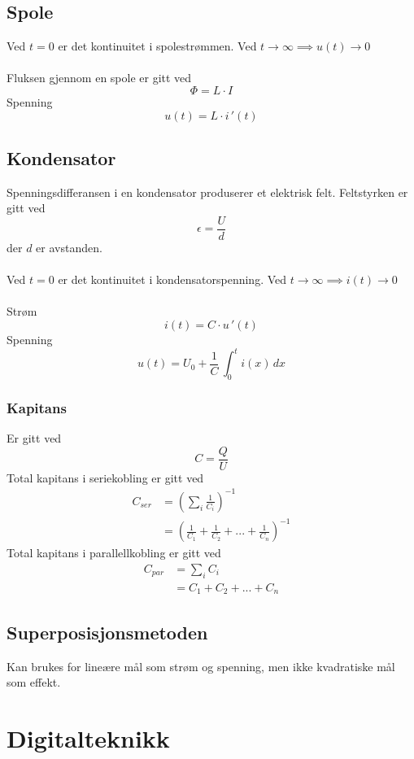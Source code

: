\documentclass{article}
\begin{document}
\subsection{Spole}
Ved $t = 0$ er det kontinuitet i spolestrømmen. Ved $t \rightarrow \infty \implies u(t) \rightarrow 0$\\\\
Fluksen gjennom en spole er gitt ved
\[\Phi = L \cdot I\]
Spenning
\[u(t) = L \cdot i\,'(t)\]

\subsection{Kondensator}
Spenningsdifferansen i en kondensator produserer et elektrisk felt.
Feltstyrken er gitt ved
\[\epsilon = \frac{U}{d}\]
der $d$ er avstanden.\\\\
Ved $t = 0$ er det kontinuitet i kondensatorspenning. Ved $t \rightarrow \infty \implies i(t) \rightarrow 0$\\\\
Strøm
\[i(t) = C \cdot u\,'(t)\]
Spenning
\[u(t) = U_0+\frac{1}{C}\,\int_0^t i(x)\,dx\]

\subsubsection{Kapitans}
Er gitt ved
\[C = \frac{Q}{U}\]
Total kapitans i seriekobling er gitt ved
\begin{align*}
    C_{ser} &= \left( \sum_i \frac{1}{C_i} \right)^{-1} \\
    &= \left(\frac{1}{C_1} + \frac{1}{C_2} + ... + \frac{1}{C_n}\right)^{-1}
\end{align*}
Total kapitans i parallellkobling er gitt ved
\begin{align*}
    C_{par} &= \sum_i C_i \\
    &= C_1 + C_2 + ... + C_n
\end{align*}


\subsection{Superposisjonsmetoden}
Kan brukes for lineære mål som strøm og spenning, men ikke kvadratiske mål som effekt.







\section{Digitalteknikk}
\end{document}
